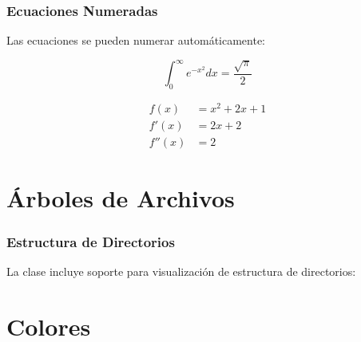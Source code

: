 \documentclass{pt-slides}
\begin{document}
\begin{frame}
    \frametitle{Ecuaciones Numeradas}

    Las ecuaciones se pueden numerar automáticamente:

    \begin{equation}
        \int_{0}^{\infty} e^{-x^2} dx = \frac{\sqrt{\pi}}{2}
    \end{equation}

    \vspace{0.3cm}

    \begin{align}
        f(x)   & = x^2 + 2x + 1 \\
        f'(x)  & = 2x + 2       \\
        f''(x) & = 2
    \end{align}
\end{frame}

\section{Árboles de Archivos}

\begin{frame}[fragile]
    \frametitle{Estructura de Directorios}

    La clase incluye soporte para visualización de estructura de directorios:

    \vspace{0.3cm}

    \begin{ptdirtree}
    \end{ptdirtree}
\end{frame}

\section{Colores}
\end{document}
